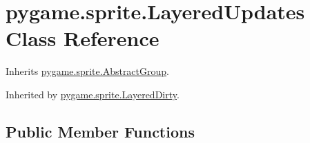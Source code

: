 \hypertarget{classpygame_1_1sprite_1_1_layered_updates}{}\section{pygame.\+sprite.\+Layered\+Updates Class Reference}
\label{classpygame_1_1sprite_1_1_layered_updates}


Inherits \hyperlink{classpygame_1_1sprite_1_1_abstract_group}{pygame.\+sprite.\+Abstract\+Group}.



Inherited by \hyperlink{classpygame_1_1sprite_1_1_layered_dirty}{pygame.\+sprite.\+Layered\+Dirty}.

\subsection*{Public Member Functions}
